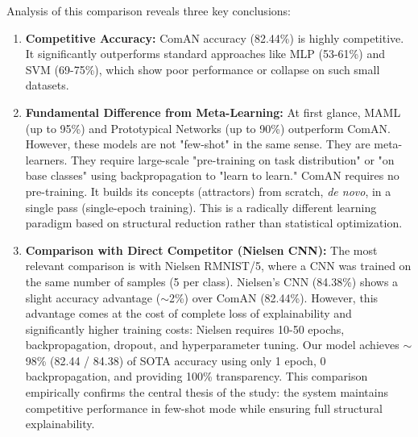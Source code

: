 \documentclass[conference]{IEEEtran}
\begin{document}
\begin{table}[t]
\centering
\caption{Comparative Table}
\end{table}

Analysis of this comparison reveals three key conclusions:
\begin{enumerate}
    \item \textbf{Competitive Accuracy:} ComAN accuracy (82.44\%) is highly competitive. It significantly outperforms standard approaches like MLP (53-61\%) and SVM (69-75\%), which show poor performance or collapse on such small datasets.
    \item \textbf{Fundamental Difference from Meta-Learning:} At first glance, MAML (up to 95\%) and Prototypical Networks (up to 90\%) outperform ComAN. However, these models are not "few-shot" in the same sense. They are meta-learners. They require large-scale "pre-training on task distribution" or "on base classes" using backpropagation to "learn to learn." ComAN requires no pre-training. It builds its concepts (attractors) from scratch, \textit{de novo}, in a single pass (single-epoch training). This is a radically different learning paradigm based on structural reduction rather than statistical optimization.
    \item \textbf{Comparison with Direct Competitor (Nielsen CNN):} The most relevant comparison is with Nielsen RMNIST/5, where a CNN was trained on the same number of samples (5 per class). Nielsen's CNN (84.38\%) shows a slight accuracy advantage ($\sim$2\%) over ComAN (82.44\%). However, this advantage comes at the cost of complete loss of explainability and significantly higher training costs: Nielsen requires 10-50 epochs, backpropagation, dropout, and hyperparameter tuning. Our model achieves $\sim$98\% (82.44 / 84.38) of SOTA accuracy using only 1 epoch, 0 backpropagation, and providing 100\% transparency. This comparison empirically confirms the central thesis of the study: the system maintains competitive performance in few-shot mode while ensuring full structural explainability.
\end{enumerate}
\end{document}
